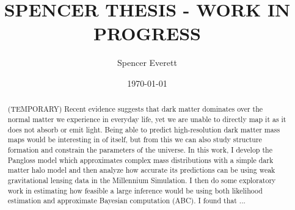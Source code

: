 \documentclass[%
 reprint,
 amsmath,amssymb,
 aps,nofootinbib
]{revtex4-1}
\begin{document}
\title{SPENCER THESIS - WORK IN PROGRESS}

\author{Spencer Everett}


\date{\today}

\begin{abstract}
\noindent (TEMPORARY) Recent evidence suggests that dark matter dominates over the normal matter we experience in everyday life, yet we are unable to directly map it as it does not absorb or emit light. Being able to predict high-resolution dark matter mass maps would be interesting in of itself, but from this we can also study structure formation and constrain the parameters of the universe. In this work, I develop the Pangloss model which approximates complex mass distributions with a simple dark matter halo model and then analyze how accurate its predictions can be using weak gravitational lensing data in the Millennium Simulation. I then do some exploratory work in estimating how feasible a large inference would be using both likelihood estimation and approximate Bayesian computation (ABC). I found that ...

\end{abstract}
\end{document}
